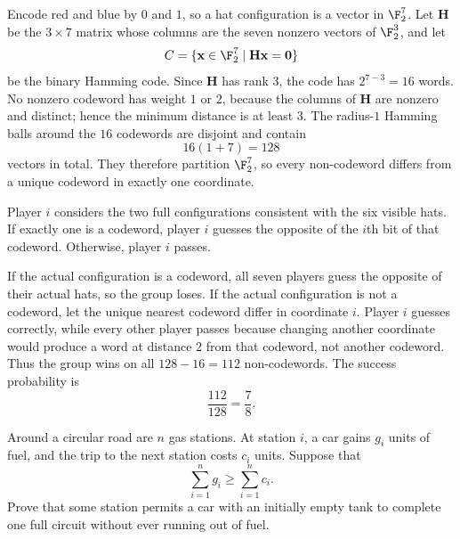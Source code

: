     \begin{solution}
        Encode red and blue by $0$ and $1$, so a hat configuration is a vector
        in $\F_2^7$. Let $\mathbf{H}$ be the $3\times7$ matrix whose
        columns are the seven nonzero vectors of $\F_2^3$, and let
        \[
            C=\{\mathbf{x}\in\F_2^7\mid
            \mathbf{H}\mathbf{x}=\mathbf{0}\}
        \]
        be the binary Hamming code. Since $\mathbf{H}$ has rank $3$, the code
        has $2^{7-3}=16$ words. No nonzero codeword has weight $1$ or $2$,
        because the columns of $\mathbf{H}$ are nonzero and distinct; hence the
        minimum distance is at least $3$. The radius-$1$ Hamming balls around
        the $16$ codewords are disjoint and contain
        \[
            16(1+7)=128
        \]
        vectors in total. They therefore partition $\F_2^7$, so every
        non-codeword differs from a unique codeword in exactly one coordinate.

        Player $i$ considers the two full configurations consistent with the
        six visible hats. If exactly one is a codeword, player $i$ guesses the
        opposite of the $i$th bit of that codeword. Otherwise, player $i$
        passes.

        If the actual configuration is a codeword, all seven players guess the
        opposite of their actual hats, so the group loses. If the actual
        configuration is not a codeword, let the unique nearest codeword differ
        in coordinate $i$. Player $i$ guesses correctly, while every other
        player passes because changing another coordinate would produce a word
        at distance $2$ from that codeword, not another codeword. Thus the group
        wins on all $128-16=112$ non-codewords. The success probability is
        \[
            \boxed{\frac{112}{128}=\frac78}.
        \]
    \end{solution}

    \begin{expectedproblem}
        Around a circular road are $n$ gas stations. At station $i$, a car gains
        $g_i$ units of fuel, and the trip to the next station costs $c_i$ units.
        Suppose that
        \[
            \sum_{i=1}^{n}g_i
            \geq
            \sum_{i=1}^{n}c_i.
        \]
        Prove that some station permits a car with an initially empty tank to
        complete one full circuit without ever running out of fuel.
    \end{expectedproblem}

